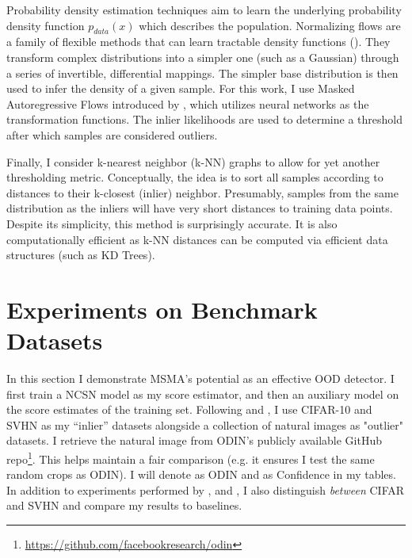 Probability density estimation techniques aim to learn the underlying probability density function $p_{data} (x)$ which describes the population. Normalizing flows are a family of flexible methods that can learn tractable density functions (\cite{Papamakarios2019}). They transform complex distributions into a simpler one (such as a Gaussian) through a series of invertible, differential mappings. The simpler base distribution is then used to infer the density of a given sample. For this work, I use Masked Autoregressive Flows introduced by \cite{Papamakarios2017masked}, which utilizes neural networks as the transformation functions. The inlier likelihoods are used to determine a threshold after which samples are considered outliers.

Finally, I consider k-nearest neighbor (k-NN) graphs to allow for yet another thresholding metric. Conceptually, the idea is to sort all samples according to distances to their k-closest (inlier) neighbor. Presumably, samples from the same distribution as the inliers will have very short distances to training data points. Despite its simplicity, this method is surprisingly accurate. It is also computationally efficient as k-NN distances can be computed via efficient data structures (such as KD Trees).


\section{Experiments on Benchmark Datasets}
\label{sec:experiments}

In this section I demonstrate MSMA's potential as an effective OOD detector. I first train a NCSN model as my score estimator, and then an auxiliary model on the score estimates of the training set. Following \cite{Liang2017} and \cite{Devries}, I use CIFAR-10 and SVHN as my “inlier” datasets alongside a collection of natural images as "outlier" datasets. I retrieve the natural image from ODIN's publicly available GitHub repo\footnote{\url{https://github.com/facebookresearch/odin}}. This helps maintain a fair comparison (e.g. it ensures I test the same random crops as ODIN). I will denote \cite{Liang2017} as ODIN and \cite{Devries} as Confidence in my tables.
In addition to experiments performed by \cite{Hendrycks2019}, \cite{Liang2017} and \cite{Devries}, I also distinguish \textit{between} CIFAR and SVHN and compare my results to baselines.



